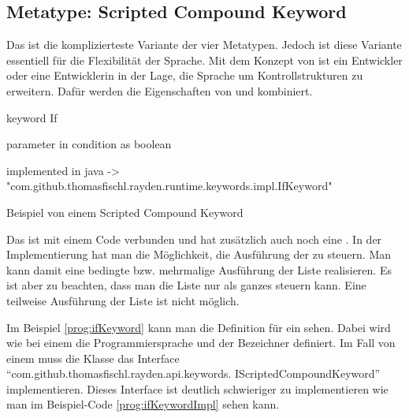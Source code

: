 
\subsection{Metatype: Scripted Compound Keyword}

Das  ist die komplizierteste Variante der vier Metatypen. Jedoch ist diese Variante essentiell für die Flexibilität der Sprache. Mit dem Konzept von  ist ein Entwickler oder eine Entwicklerin in der Lage, die Sprache um Kontrollstrukturen zu erweitern. Dafür werden die Eigenschaften von  und  kombiniert. 

\begin{program}
\begin{JavaCode}
keyword If { 
	parameter in condition as boolean

	implemented in java -> "com.github.thomasfischl.rayden.runtime.keywords.impl.IfKeyword"
}
\end{JavaCode}
\caption{Beispiel von einem Scripted Compound Keyword}
\label{prog:ifKeyword}
\end{program}

\SuperPar
Das  ist mit einem Code verbunden und hat zusätzlich auch noch eine . In der Implementierung hat man die Möglichkeit, die Ausführung der  zu steuern. Man kann damit eine bedingte bzw. mehrmalige Ausführung der Liste realisieren. Es ist aber zu beachten, dass man die Liste nur als ganzes steuern kann. Eine teilweise Ausführung der Liste ist nicht möglich.

\SuperPar
Im Beispiel \ref{prog:ifKeyword} kann man die Definition für ein  sehen. Dabei wird wie bei einem  die Programmiersprache und der Bezeichner definiert. Im Fall von einem  muss die Klasse das Interface "`com.github.thomasfischl.rayden.api.keywords. IScriptedCompoundKeyword"' implementieren. Dieses Interface ist deutlich schwieriger zu implementieren wie man im Beispiel-Code \ref{prog:ifKeywordImpl} sehen kann.

